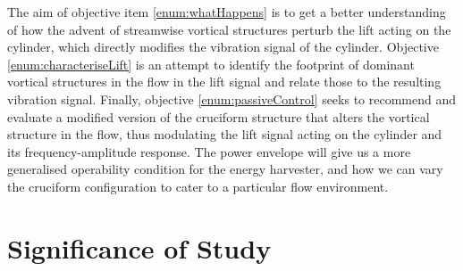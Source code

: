 \documentclass[oneside]{utmthesis}
\begin{document}
The aim of objective item \ref{enum:whatHappens} is to get a better understanding of how the advent of streamwise vortical structures perturb the lift acting on the cylinder, which directly modifies the vibration signal of the cylinder. Objective \ref{enum:characteriseLift} is an attempt to identify the footprint of dominant vortical structures in the flow in the lift signal and relate those to the resulting vibration signal. Finally, objective \ref{enum:passiveControl} seeks to recommend and evaluate a modified version of the cruciform structure that alters the vortical structure in the flow, thus modulating the lift signal acting on the cylinder and its frequency-amplitude response. The power envelope will give us a more generalised operability condition for the energy harvester, and how we can vary the cruciform configuration to cater to a particular flow environment.

\section{Significance of Study}


\end{document}
